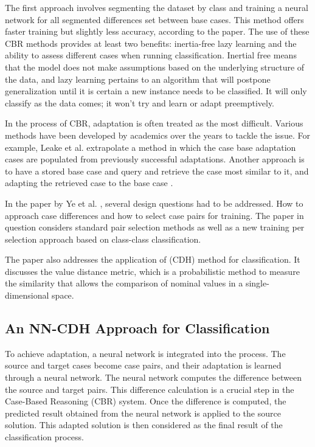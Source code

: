 \documentclass[a4paper, 12pt]{report}
\begin{document}
The first approach involves segmenting the dataset by class and training a neural network for all segmented differences set between base cases. 
This method offers faster training but slightly less accuracy, according to the paper. 
The use of these CBR methods provides at least two benefits: inertia-free lazy learning and the ability to assess different cases when running classification. 
Inertial free means that the model does not make assumptions based on the underlying structure of the data, and lazy learning pertains to an algorithm that will postpone generalization 
until it is certain a new instance needs to be classified. It will only classify as the data comes; it won't try and learn or adapt preemptively.

In the process of CBR, adaptation is often treated as the most difficult. Various methods have been developed by academics over the years to tackle the issue. 
For example, Leake et al. \cite{leake1996acquiring} extrapolate a method in which the case base adaptation cases are populated from previously successful adaptations. 
Another approach is to have a stored base case and query and retrieve the case most similar to it, and adapting the retrieved case to the base case \cite{craw2006learning}.

In the paper by Ye et al. \cite{ye2021learning}, several design questions had to be addressed. 
How to approach case differences and how to select case pairs for training. 
The paper in question \cite{ye2021learning} considers standard pair selection methods as well as a new training per selection approach based on class-class classification.

The paper \cite{ye2021learning} also addresses the application of (CDH) method for classification. 
It discusses the value distance metric, which is a probabilistic method to measure the similarity that allows the comparison of nominal values in a single-dimensional space.

\subsection{An NN-CDH Approach for Classification}

To achieve adaptation, a neural network is integrated into the process. The source and target cases become case pairs, and their adaptation is learned through a neural network. 
The neural network computes the difference between the source and target pairs. 
This difference calculation is a crucial step in the Case-Based Reasoning (CBR) system. Once the difference is computed, the predicted result obtained from the neural network is applied to the source solution. 
This adapted solution is then considered as the final result of the classification process.
\end{document}
